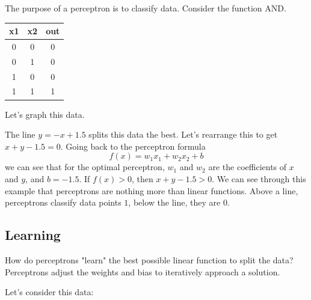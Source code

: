 \documentclass{article}
\begin{document}
The purpose of a perceptron is to classify data. Consider the function AND.
\begin{center}
\begin{tabular}{ |c|c|c| } 
 \hline
 x1 & x2 & out \\
 \hline
 0 & 0 & 0 \\ 
 0 & 1 & 0 \\ 
 1 & 0 & 0 \\ 
 1 & 1 & 1 \\ 
 \hline
\end{tabular}
\end{center}
Let's graph this data.
\begin{center}
\end{center}

The line $y = -x + 1.5$ splits this data the best.
Let's rearrange this to get $x + y - 1.5 = 0$. 
Going back to the perceptron formula
\[f(x) = w_1x_1 + w_2x_2 + b\]
we can see that for the optimal perceptron,  $w_1$ and $w_2$ are the coefficients of $x$ and $y$, and $b=-1.5$. If $f(x) > 0$, then $x + y - 1.5>0$. We can see through this example that perceptrons are nothing more than linear functions. Above a line, perceptrons classify data points $1$, below the line, they are $0$.

\subsection{Learning}

How do perceptrons "learn" the best possible linear function to split the data? Perceptrons adjust the weights and bias to iteratively approach a solution.

Let's consider this data:
\begin{center}
\end{center}
\end{document}
